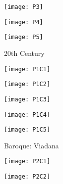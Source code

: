 \begin{figure}
\centering
\begin{minipage}{.5\textwidth}
  \centering
  \texttt{[image: P3]}
  \label{fig:test1}
\end{minipage}%
\begin{minipage}{.5\textwidth}
  \centering
  \texttt{[image: P4]}
  \label{fig:test2}
\end{minipage}
\end{figure}

\begin{figure}[h]
\caption{20th Century}
\centering
\texttt{[image: P5]}
\end{figure}

\begin{figure}
\centering
\begin{minipage}{.5\textwidth}
  \centering
  \texttt{[image: P1C1]}
  \label{fig:test1}
\end{minipage}%
\begin{minipage}{.5\textwidth}
  \centering
  \texttt{[image: P1C2]}
  \label{fig:test2}
\end{minipage}
\end{figure}

\begin{figure}
\centering
\begin{minipage}{.5\textwidth}
  \centering
  \texttt{[image: P1C3]}
  \label{fig:test1}
\end{minipage}%
\begin{minipage}{.5\textwidth}
  \centering
  \texttt{[image: P1C4]}
  \label{fig:test2}
\end{minipage}
\end{figure}

\begin{figure}[h]
\caption{Baroque: Viadana}
\centering
\texttt{[image: P1C5]}
\end{figure}

\begin{figure}
\centering
\begin{minipage}{.5\textwidth}
  \centering
  \texttt{[image: P2C1]}
  \label{fig:test1}
\end{minipage}%
\begin{minipage}{.5\textwidth}
  \centering
  \texttt{[image: P2C2]}
  \label{fig:test2}
\end{minipage}
\end{figure}

